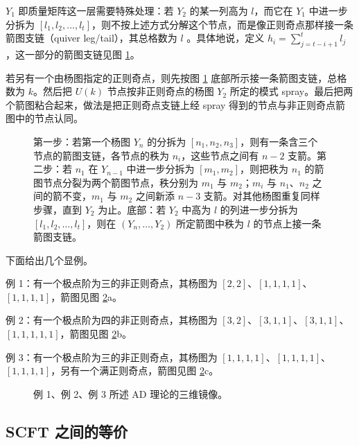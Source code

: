 
$Y_1$ 即质量矩阵这一层需要特殊处理：若 $Y_2$ 的某一列高为 $l$，而它在 $Y_1$ 中进一步分拆为 $[l_1,l_2,\dots,l_t]$，则不按上述方式分解这个节点，而是像正则奇点那样接一条箭图支链（quiver leg/tail），其总格数为 $l$ \cite{38}。具体地说，定义 $h_i=\sum_{j=t-i+1}^{t}l_j$，这一部分的箭图支链见图 \ref{fig:16}。

若另有一个由杨图指定的正则奇点，则先按图 \ref{fig:16} 底部所示接一条箭图支链，总格数为 $k$。然后把 $U(k)$ 节点按非正则奇点的杨图 $Y_2$ 所定的模式 spray。最后把两个箭图粘合起来，做法是把正则奇点支链上经 spray 得到的节点与非正则奇点箭图中的节点认同。

\begin{figure}[tbp]
\centering

\caption{第一步：若第一个杨图 $Y_n$ 的分拆为 $[n_1,n_2,n_3]$，则有一条含三个节点的箭图支链，各节点的秩为 $n_i$，这些节点之间有 $n-2$ 支箭。第二步：若 $n_1$ 在 $Y_{n-1}$ 中进一步分拆为 $[m_1,m_2]$，则把秩为 $n_1$ 的箭图节点分裂为两个箭图节点，秩分别为 $m_1$ 与 $m_2$；$m_i$ 与 $n_1$、$n_2$ 之间的箭不变，$m_1$ 与 $m_2$ 之间新添 $n-3$ 支箭。对其他杨图重复同样步骤，直到 $Y_2$ 为止。底部：若 $Y_2$ 中高为 $l$ 的列进一步分拆为 $[l_1,l_2,\dots,l_t]$，则在 $(Y_n,\dots,Y_2)$ 所定箭图中秩为 $l$ 的节点上接一条箭图支链。}
\label{fig:16}
\end{figure}

下面给出几个显例。

例 1：有一个极点阶为三的非正则奇点，其杨图为 $[2,2]$、$[1,1,1,1]$、$[1,1,1,1]$，箭图见图 \ref{fig:17}a。

例 2：有一个极点阶为四的非正则奇点，其杨图为 $[3,2]$、$[3,1,1]$、$[3,1,1]$、$[1,1,1,1,1]$，箭图见图 \ref{fig:17}b。

例 3：有一个极点阶为三的非正则奇点，其杨图为 $[1,1,1,1]$、$[1,1,1,1]$、$[1,1,1,1]$，另有一个满正则奇点，箭图见图 \ref{fig:17}c。

\begin{figure}[tbp]
\centering

\caption{例 1、例 2、例 3 所述 AD 理论的三维镜像。}
\label{fig:17}
\end{figure}

\subsection{SCFT 之间的等价}
\label{sec:6.3}

